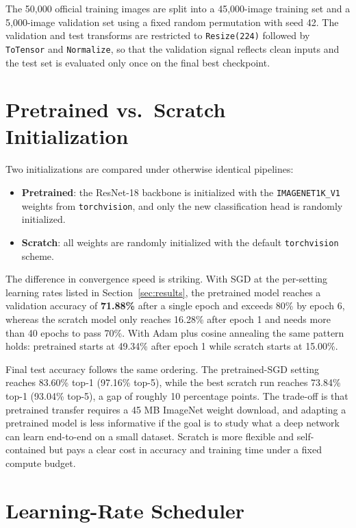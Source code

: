 \documentclass[10pt,a4paper]{article}
\begin{document}
The 50{,}000 official training images are split into a 45{,}000-image training set and a 5{,}000-image validation set using a fixed random permutation with seed 42. The validation and test transforms are restricted to \texttt{Resize(224)} followed by \texttt{ToTensor} and \texttt{Normalize}, so that the validation signal reflects clean inputs and the test set is evaluated only once on the final best checkpoint.

\section{Pretrained vs.\ Scratch Initialization}

Two initializations are compared under otherwise identical pipelines:

\begin{itemize}[leftmargin=*,itemsep=0pt]
    \item \textbf{Pretrained}: the ResNet-18 backbone is initialized with the \texttt{IMAGENET1K\_V1} weights from \texttt{torchvision}, and only the new classification head is randomly initialized.
    \item \textbf{Scratch}: all weights are randomly initialized with the default \texttt{torchvision} scheme.
\end{itemize}

The difference in convergence speed is striking. With SGD at the per-setting learning rates listed in Section~\ref{sec:results}, the pretrained model reaches a validation accuracy of \textbf{71.88\%} after a single epoch and exceeds 80\% by epoch 6, whereas the scratch model only reaches 16.28\% after epoch 1 and needs more than 40 epochs to pass 70\%. With Adam plus cosine annealing the same pattern holds: pretrained starts at 49.34\% after epoch 1 while scratch starts at 15.00\%.

Final test accuracy follows the same ordering. The pretrained-SGD setting reaches 83.60\% top-1 (97.16\% top-5), while the best scratch run reaches 73.84\% top-1 (93.04\% top-5), a gap of roughly 10 percentage points. The trade-off is that pretrained transfer requires a 45 MB ImageNet weight download, and adapting a pretrained model is less informative if the goal is to study what a deep network can learn end-to-end on a small dataset. Scratch is more flexible and self-contained but pays a clear cost in accuracy and training time under a fixed compute budget.

\section{Learning-Rate Scheduler}
\end{document}
